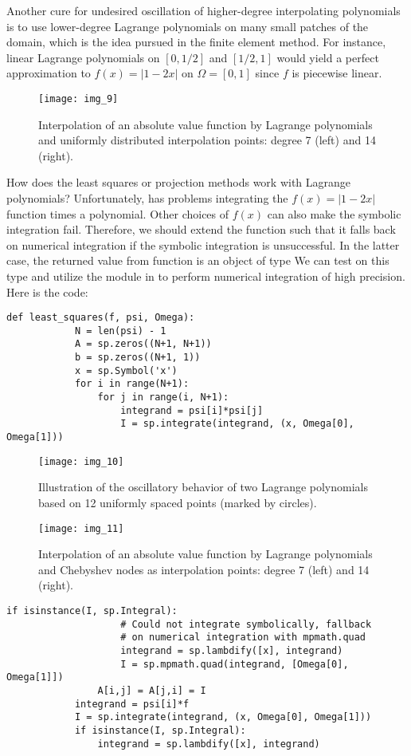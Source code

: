 \documentclass[../main.tex]{subfiles}
\begin{document}
	Another cure for undesired oscillation of higher-degree interpolating polynomials is to use lower-degree Lagrange polynomials on many small patches of the domain, which is the idea pursued in the finite element method. For instance, linear Lagrange polynomials on $[0,1 / 2]$ and $[1 / 2,1]$ would yield a perfect approximation to $f(x)=|1-2 x|$ on $\Omega=[0,1]$ since $f$ is piecewise linear.
	\begin{figure}[H]
		\centering
		\texttt{[image: img\_9]}
		\caption{Interpolation of an absolute value function by Lagrange polynomials and uniformly distributed interpolation points: degree 7 (left) and 14 (right).}
		\label{fig:img_9}
	\end{figure}
	How does the least squares or projection methods work with Lagrange polynomials? Unfortunately,  has problems integrating the $f(x)=|1-2 x|$ function times a polynomial. Other choices of $f(x)$ can also make the symbolic integration fail. Therefore, we should extend the  function such that it falls back on numerical integration if the symbolic integration is unsuccessful. In the latter case, the returned value from  function is an object of type  We can test on this type and utilize the  module in  to perform numerical integration of high precision. Here is the code:
	\begin{lstlisting}[numbers=none]
		def least_squares(f, psi, Omega):
			N = len(psi) - 1
			A = sp.zeros((N+1, N+1))
			b = sp.zeros((N+1, 1))
			x = sp.Symbol('x')
			for i in range(N+1):
				for j in range(i, N+1):
					integrand = psi[i]*psi[j]
					I = sp.integrate(integrand, (x, Omega[0], Omega[1]))	
	\end{lstlisting}
	\begin{figure}[H]
		\centering
		\texttt{[image: img\_10]}
		\caption{Illustration of the oscillatory behavior of two Lagrange polynomials
			based on 12 uniformly spaced points (marked by circles).}
		\label{fig:img_10}
	\end{figure}
	\begin{figure}[H]
		\centering
		\texttt{[image: img\_11]}
		\caption{ Interpolation of an absolute value function by Lagrange polynomials
			and Chebyshev nodes as interpolation points: degree 7 (left) and 14 (right).}
		\label{fig:img_11}
	\end{figure}
	\begin{lstlisting}[numbers=none]
				if isinstance(I, sp.Integral):
					# Could not integrate symbolically, fallback
					# on numerical integration with mpmath.quad
					integrand = sp.lambdify([x], integrand)
					I = sp.mpmath.quad(integrand, [Omega[0], Omega[1]])
				A[i,j] = A[j,i] = I
			integrand = psi[i]*f
			I = sp.integrate(integrand, (x, Omega[0], Omega[1]))
			if isinstance(I, sp.Integral):
				integrand = sp.lambdify([x], integrand)
	\end{lstlisting}
\end{document}
